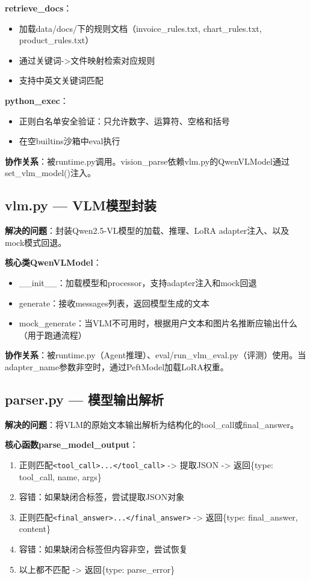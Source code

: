 \documentclass[fontset=none,11pt,a4paper]{ctexart}
\begin{document}
\textbf{retrieve\_docs}：
\begin{itemize}[nosep]
    \item 加载data/docs/下的规则文档（invoice\_rules.txt, chart\_rules.txt, product\_rules.txt）
    \item 通过关键词->文件映射检索对应规则
    \item 支持中英文关键词匹配
\end{itemize}

\textbf{python\_exec}：
\begin{itemize}[nosep]
    \item 正则白名单安全验证：只允许数字、运算符、空格和括号
    \item 在空builtins沙箱中eval执行
\end{itemize}

\textbf{协作关系}：被runtime.py调用。vision\_parse依赖vlm.py的QwenVLModel通过set\_vlm\_model()注入。

\subsection{vlm.py --- VLM模型封装}

\textbf{解决的问题}：封装Qwen2.5-VL模型的加载、推理、LoRA adapter注入、以及mock模式回退。

\textbf{核心类QwenVLModel}：
\begin{itemize}[nosep]
    \item \_\_init\_\_：加载模型和processor，支持adapter注入和mock回退
    \item generate：接收messages列表，返回模型生成的文本
    \item mock\_generate：当VLM不可用时，根据用户文本和图片名推断应输出什么（用于跑通流程）
\end{itemize}

\textbf{协作关系}：被runtime.py（Agent推理）、eval/run\_vlm\_eval.py（评测）使用。当adapter\_name参数非空时，通过PeftModel加载LoRA权重。

\subsection{parser.py --- 模型输出解析}

\textbf{解决的问题}：将VLM的原始文本输出解析为结构化的tool\_call或final\_answer。

\textbf{核心函数parse\_model\_output}：
\begin{enumerate}[nosep]
    \item 正则匹配\texttt{<tool\_call>...</tool\_call>} -> 提取JSON -> 返回\{type: tool\_call, name, args\}
    \item 容错：如果缺闭合标签，尝试提取JSON对象
    \item 正则匹配\texttt{<final\_answer>...</final\_answer>} -> 返回\{type: final\_answer, content\}
    \item 容错：如果缺闭合标签但内容非空，尝试恢复
    \item 以上都不匹配 -> 返回\{type: parse\_error\}
\end{enumerate}
\end{document}
